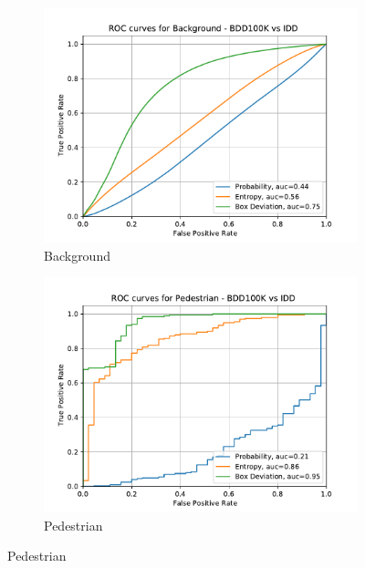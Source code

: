      \begin{figure}[H]
    	\centering
    	\begin{subfigure}[t]{0.495\textwidth}
    		\centering
    		\includegraphics[width=\textwidth]{images/ROC/background_ROC_bdd_vs_idd_Score_using_subens.pdf}
    		\caption{Background}
    	\end{subfigure}
    	\begin{subfigure}[t]{0.495\textwidth}
    		\centering
    		\includegraphics[width=\textwidth]{images/ROC/pedestrian_ROC_bdd_vs_idd_Score_using_subens.pdf}
    		\caption{Pedestrian}
    	\end{subfigure}
    	

\end{figure}
